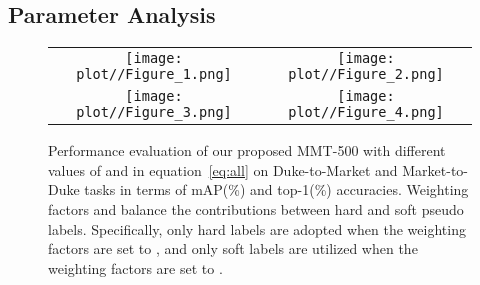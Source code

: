 \documentclass{article} \usepackage{iclr2020_conference,times}
\def\eqref#1{equation~\ref{#1}}
\begin{document}
\subsection{Parameter Analysis}
\label{sec:triid}

\begin{figure}[H]
\centering
    \scriptsize
    \begin{tabular}{@{}c@{}c@{}}
    \texttt{[image: plot//Figure\_1.png]} & \texttt{[image: plot//Figure\_2.png]}\\
    \texttt{[image: plot//Figure\_3.png]} & \texttt{[image: plot//Figure\_4.png]}\\
    \end{tabular}
    \caption{Performance evaluation of our proposed MMT-500 with different values of  and  in \eqref{eq:all} on Duke-to-Market and Market-to-Duke tasks in terms of mAP(\%) and top-1(\%) accuracies. Weighting factors  and  balance the contributions between hard and soft pseudo labels. Specifically, only hard labels are adopted when the weighting factors are set to , and only soft labels are utilized when the weighting factors are set to . }
    \label{fig:param}
\end{figure}
\end{document}
